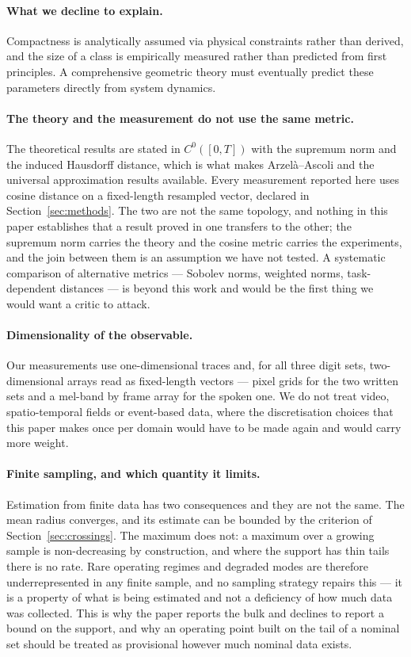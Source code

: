 \documentclass[10pt]{article}
\theoremstyle{plain}
\theoremstyle{definition}
\theoremstyle{remark}
\begin{document}
\paragraph{What we decline to explain.}
Compactness is analytically assumed via physical constraints rather than derived, and the size of a class is empirically measured rather than predicted from first principles. A comprehensive geometric theory must eventually predict these parameters directly from system dynamics.

\paragraph{The theory and the measurement do not use the same metric.}
The theoretical results are stated in $C^0([0,T])$ with the supremum norm and
the induced Hausdorff distance, which is what makes Arzel\`a--Ascoli and the
universal approximation results available. Every measurement reported here uses
cosine distance on a fixed-length resampled vector, declared in
Section~\ref{sec:methods}. The two are not the same topology, and nothing in
this paper establishes that a result proved in one transfers to the other; the
supremum norm carries the theory and the cosine metric carries the experiments,
and the join between them is an assumption we have not tested. A systematic
comparison of alternative metrics --- Sobolev norms, weighted norms,
task-dependent distances --- is beyond this work and would be the first thing
we would want a critic to attack.

\paragraph{Dimensionality of the observable.}
Our measurements use one-dimensional traces and, for all three digit sets,
two-dimensional arrays read as fixed-length vectors --- pixel grids for the two
written sets and a mel-band by frame array for the spoken one. We do not treat video,
spatio-temporal fields or event-based data, where the discretisation choices
that this paper makes once per domain would have to be made again and would
carry more weight.

\paragraph{Finite sampling, and which quantity it limits.}
Estimation from finite data has two consequences and they are not the same. The
mean radius converges, and its estimate can be bounded by the criterion of
Section~\ref{sec:crossings}. The maximum does not: a maximum over a growing
sample is non-decreasing by construction, and where the support has thin tails
there is no rate. Rare operating regimes and degraded modes are therefore
underrepresented in any finite sample, and no sampling strategy repairs this ---
it is a property of what is being estimated and not a deficiency of how much
data was collected. This is why the paper reports the bulk and declines to
report a bound on the support, and why an operating point built on the tail of
a nominal set should be treated as provisional however much nominal data exists.
\end{document}
